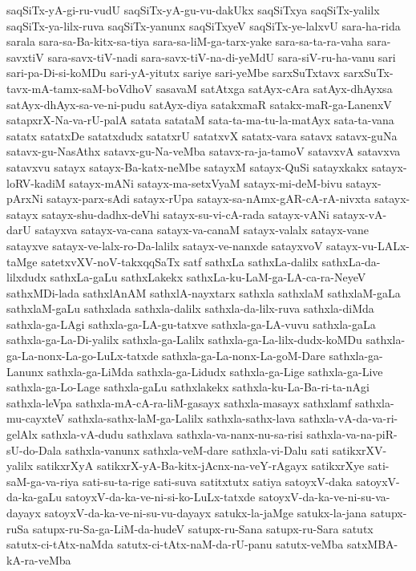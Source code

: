 {saqSiTx-yA-gi-ru-vudU
saqSiTx-yA-gu-vu-dakUkx
saqSiTxya
saqSiTx-yalilx
saqSiTx-ya-lilx-ruva
saqSiTx-yanunx
saqSiTxyeV
saqSiTx-ye-lalxvU
sara-ha-rida
sarala
sara-sa-Ba-kitx-sa-tiya
sara-sa-liM-ga-tarx-yake
sara-sa-ta-ra-vaha
sara-savxtiV
sara-savx-tiV-nadi
sara-savx-tiV-na-di-yeMdU
sara-siV-ru-ha-vanu
sari
sari-pa-Di-si-koMDu
sari-yA-yitutx
sariye
sari-yeMbe
sarxSuTxtavx
sarxSuTx-tavx-mA-tamx-saM-boVdhoV
sasavaM
satAtxga
satAyx-cAra
satAyx-dhAyxsa
satAyx-dhAyx-sa-ve-ni-pudu
satAyx-diya
satakxmaR
satakx-maR-ga-LanenxV
satapxrX-Na-va-rU-palA
satata
satataM
sata-ta-ma-tu-la-matAyx
sata-ta-vana
satatx
satatxDe
satatxdudx
satatxrU
satatxvX
satatx-vara
satavx
satavx-guNa
satavx-gu-NasAthx
satavx-gu-Na-veMba
satavx-ra-ja-tamoV
satavxvA
satavxva
satavxvu
satayx
satayx-Ba-katx-neMbe
satayxM
satayx-QuSi
satayxkakx
satayx-loRV-kadiM
satayx-mANi
satayx-ma-setxVyaM
satayx-mi-deM-bivu
satayx-pArxNi
satayx-parx-sAdi
satayx-rUpa
satayx-sa-nAmx-gAR-cA-rA-nivxta
satayx-satayx
satayx-shu-dadhx-deVhi
satayx-su-vi-cA-rada
satayx-vANi
satayx-vA-darU
satayxva
satayx-va-cana
satayx-va-canaM
satayx-valalx
satayx-vane
satayxve
satayx-ve-lalx-ro-Da-lalilx
satayx-ve-nanxde
satayxvoV
satayx-vu-LALx-taMge
satetxvXV-noV-takxqqSaTx
satf
sathxLa
sathxLa-dalilx
sathxLa-da-lilxdudx
sathxLa-gaLu
sathxLakekx
sathxLa-ku-LaM-ga-LA-ca-ra-NeyeV
sathxMDi-lada
sathxlAnAM
sathxlA-nayxtarx
sathxla
sathxlaM
sathxlaM-gaLa
sathxlaM-gaLu
sathxlada
sathxla-dalilx
sathxla-da-lilx-ruva
sathxla-diMda
sathxla-ga-LAgi
sathxla-ga-LA-gu-tatxve
sathxla-ga-LA-vuvu
sathxla-gaLa
sathxla-ga-La-Di-yalilx
sathxla-ga-Lalilx
sathxla-ga-La-lilx-dudx-koMDu
sathxla-ga-La-nonx-La-go-LuLx-tatxde
sathxla-ga-La-nonx-La-goM-Dare
sathxla-ga-Lanunx
sathxla-ga-LiMda
sathxla-ga-Lidudx
sathxla-ga-Lige
sathxla-ga-Live
sathxla-ga-Lo-Lage
sathxla-gaLu
sathxlakekx
sathxla-ku-La-Ba-ri-ta-nAgi
sathxla-leVpa
sathxla-mA-cA-ra-liM-gasayx
sathxla-masayx
sathxlamf
sathxla-mu-cayxteV
sathxla-sathx-laM-ga-Lalilx
sathxla-sathx-lava
sathxla-vA-da-va-ri-gelAlx
sathxla-vA-dudu
sathxlava
sathxla-va-nanx-nu-sa-risi
sathxla-va-na-piR-sU-do-Dala
sathxla-vanunx
sathxla-veM-dare
sathxla-vi-Dalu
sati
satikxrXV-yalilx
satikxrXyA
satikxrX-yA-Ba-kitx-jAcnx-na-veY-rAgayx
satikxrXye
sati-saM-ga-va-riya
sati-su-ta-rige
sati-suva
satitxtutx
satiya
satoyxV-daka
satoyxV-da-ka-gaLu
satoyxV-da-ka-ve-ni-si-ko-LuLx-tatxde
satoyxV-da-ka-ve-ni-su-va-dayayx
satoyxV-da-ka-ve-ni-su-vu-dayayx
satukx-la-jaMge
satukx-la-jana
satupx-ruSa
satupx-ru-Sa-ga-LiM-da-hudeV
satupx-ru-Sana
satupx-ru-Sara
satutx
satutx-ci-tAtx-naMda
satutx-ci-tAtx-naM-da-rU-panu
satutx-veMba
satxMBA-kA-ra-veMba
}

